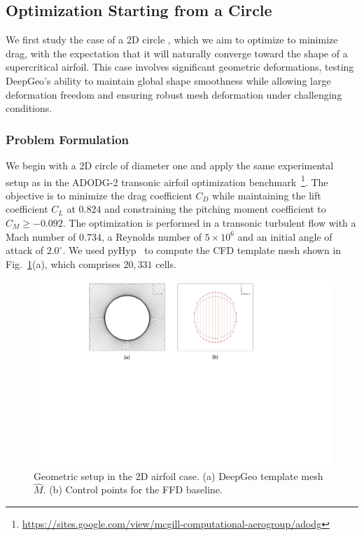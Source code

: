 \subsection{Optimization Starting from a Circle}
\label{ch5:sec:cs1}

We first study the case of a 2D circle , which we aim to optimize to minimize drag, with the expectation that it will naturally converge toward the shape of a supercritical airfoil. This case involves significant geometric deformations, testing DeepGeo’s ability to maintain global shape smoothness while allowing large deformation freedom and ensuring robust mesh deformation under challenging conditions.

\subsubsection{Problem Formulation}

We begin with a 2D circle of diameter one and apply the same experimental setup as in the ADODG-2 transonic airfoil optimization benchmark~\footnote{\url{https://sites.google.com/view/mcgill-computational-aerogroup/adodg}}. The objective is to minimize the drag coefficient $C_D$ while maintaining the lift coefficient $C_L$ at $0.824$ and constraining the pitching moment coefficient to $C_M \geq -0.092$. The optimization is performed in a transonic turbulent flow with a Mach number of $0.734$, a Reynolds number of $5\times 10^6$ and an initial angle of attack of $2.0^{\circ}$. 
We used pyHyp~\cite{aa.Secco2021} to compute the CFD template mesh shown in Fig.~\ref{ch5:fig:cs1_template_mesh}(a), which comprises $20,331$ cells.



\begin{figure}[htb]
    \begin{center}
        \includegraphics[width=0.8\linewidth]{chapter5/fig/circle2airfoil_template_mesh_initial_geometry.pdf}
    \end{center}
     \vspace{-7mm}
    \caption{
        \small Geometric setup in the 2D airfoil case. (a) DeepGeo template mesh $\hat{M}$. (b) Control points for the FFD baseline.
    }
    \label{ch5:fig:cs1_template_mesh}
\end{figure}

